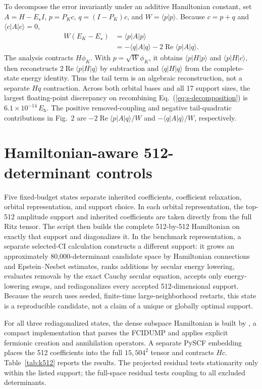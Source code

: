 \documentclass[aps,onecolumn,superscriptaddress,nofootinbib,longbibliography]{revtex4-2}
\newcommand{\Eh}{E_{\mathrm h}}
\begin{document}
To decompose the error invariantly under an additive Hamiltonian constant, set
\(A=H-E_\star I\), \(p=P_Kc\), \(q=(I-P_K)c\), and
\(W=\langle p|p\rangle\).  Because \(c=p+q\) and
\(\langle c|A|c\rangle=0\),
\begin{align}
 W(E_K-E_\star)&=\langle p|A|p\rangle\\
 &=-\langle q|A|q\rangle
 -2\operatorname{Re}\langle p|A|q\rangle.
 \label{eq:s-decomposition}
\end{align}
The analysis contracts \(H\phi_K\).  With \(p=\sqrt{W}\phi_K\), it obtains
\(\langle p|H|p\rangle\) and \(\langle p|H|c\rangle\), then reconstructs
\(2\operatorname{Re}\langle p|H|q\rangle\) by subtraction and
\(\langle q|H|q\rangle\) from the complete-state energy identity.  Thus the
tail term is an algebraic reconstruction, not a separate \(Hq\) contraction.
Across both orbital bases and all 17 support sizes, the largest floating-point
discrepancy on recombining Eq.~(\ref{eq:s-decomposition}) is
\(6.1\times10^{-14}\,\Eh\).  The positive removed-coupling and negative
tail-quadratic contributions in Fig.~2 are
\(-2\operatorname{Re}\langle p|A|q\rangle/W\) and
\(-\langle q|A|q\rangle/W\), respectively.

\section{Hamiltonian-aware 512-determinant controls}

Five fixed-budget states separate inherited coefficients, coefficient
relaxation, orbital representation, and support choice.  In each orbital
representation, the top-512 amplitude support and inherited coefficients are
taken directly from the full Ritz tensor.  The script
 then builds the complete
512-by-512 Hamiltonian on exactly that support and diagonalizes it.  In the
benchmark representation, a separate selected-CI calculation constructs a
different support: it grows an approximately 80,000-determinant candidate
space by
Hamiltonian connections and Epstein--Nesbet estimates, ranks additions by
secular energy lowering, evaluates removals by the exact Cauchy secular
equation, accepts only energy-lowering swaps, and rediagonalizes every accepted
512-dimensional support.  Because the search uses seeded, finite-time
large-neighborhood restarts, this state is a reproducible candidate, not a
claim of a unique or globally optimal support.

For all three rediagonalized states, the dense subspace Hamiltonian is built by
, a compact implementation that
parses the FCIDUMP and applies explicit fermionic creation and annihilation
operators.  A separate PySCF embedding places the 512 coefficients into the
full \(15{,}504^2\) tensor and contracts \(Hc\).  Table~\ref{tab:k512} reports
the results.  The projected residual tests stationarity only within the listed
support; the full-space residual tests coupling to all excluded determinants.
\end{document}
